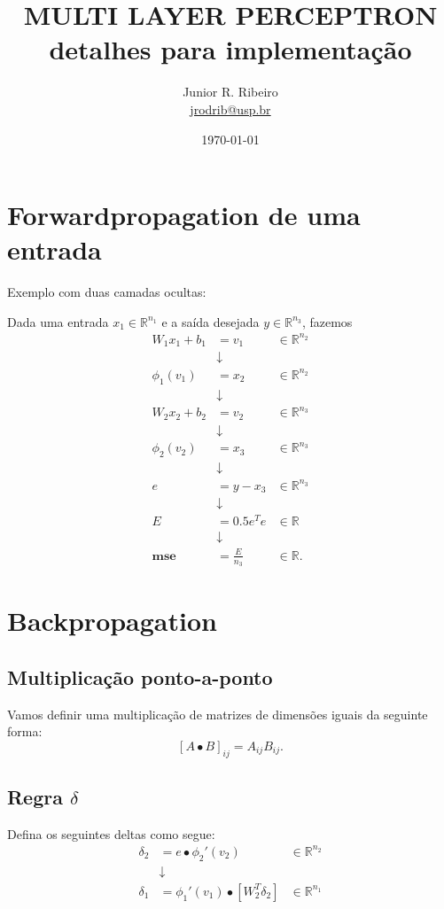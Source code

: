 \documentclass[12pt,a4paper]{article}
\title{MULTI LAYER PERCEPTRON\\detalhes para implementação}
\author{Junior R. Ribeiro \\ \url{jrodrib@usp.br}}
\date{\today}
\def\RR{\mathbb{R}}
\begin{document}
\maketitle
\tableofcontents
\newpage

\section{Forwardpropagation de uma entrada}
Exemplo com duas camadas ocultas:

Dada uma entrada $x_1\in\RR^{n_1}$ e a saída desejada $y\in\RR^{n_3}$, fazemos
\begin{equation}
\begin{aligned}
W_1x_1+b_1 &= v_1&\in\RR^{n_2}\\
&\downarrow\\
\phi_1(v_1) &= x_2&\in\RR^{n_2}\\
&\downarrow\\
W_2x_2+b_2 &= v_2&\in\RR^{n_3}\\
&\downarrow\\
\phi_2(v_2) &= x_3&\in\RR^{n_3}\\
&\downarrow\\
e &= y-x_3&\in\RR^{n_3}\\
&\downarrow\\
E&=0.5e^Te&\in\RR\\
&\downarrow\\
\mathbf{mse}&=\frac{E}{n_ 3}&\in\RR.
\end{aligned}
\end{equation}


\section{Backpropagation}
\subsection{Multiplicação ponto-a-ponto}
Vamos definir uma multiplicação de matrizes de dimensões iguais da seguinte forma:
\[
[A\bullet B]_{ij}=A_{ij}B_{ij}.
\]
\subsection{Regra $\delta$}
Defina os seguintes deltas como segue:
\begin{equation}
\begin{aligned}
\delta_2 &= e \bullet \phi_2'(v_2)&\in\RR^{n_2}\\
&\downarrow\\
\delta_1 &= \phi_1'(v_1) \bullet [W_2^T\delta_2]&\in\RR^{n_1}
\end{aligned}
\end{equation}
\end{document}
